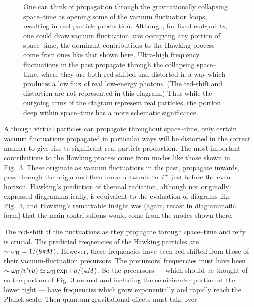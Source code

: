 \documentclass[12pt]{article}
\def\scrif{{\mathcal I}^+}
\begin{document}
\begin{figure}[t]
\epsfxsize=2in
\caption{One can think of propagation through the 
gravitationally collapsing space--time as opening some of the 
vacuum fluctuation loops, resulting in real particle production.  
Although, for fixed end-points, one could draw vacuum fluctuation
arcs occupying any portion of space--time, the dominant contributions
to the Hawking process come from ones like that shown here.
Ultra-high frequency fluctuations in the past propagate through the
collapsing space--time, where they are both red-shifted and distorted
in a way which produces a low flux of real low-energy photons.
(The red-shift and distortion are not represented in this diagram.)
Thus while the outgoing arms of the diagram represent real particles, the
portion deep within space--time has a more schematic significance.
}
\end{figure}

Although virtual particles can propagate throughout space--time, only certain
vacuum fluctuations propagated in particular ways will be distorted in the
correct manner to give rise to significant real particle production.  The most
important contributions to the Hawking process come from modes like those shown
in Fig.~3. These originate as vacuum fluctuations in the past, propagate
inwards, pass through the origin and then move outwards to $\scrif$ just before
the event horizon.  Hawking's prediction of thermal radiation, although not
originally expressed diagrammatically, is equivalent to the evaluation of 
diagrams like Fig.~3, and Hawking's remarkable insight was (again, recast in
diagrammatic form) that the main contributions would come from the modes shown
there.

The red-shift of the fluctuations as they propagate through space--time and
reify is crucial.  The predicted frequencies of the Hawking particles are $\sim
\omega _{\rm H}=1/(8\pi M)$.  However, these frequencies have been red-shifted
from those of their vacuum-fluctuation precursors.  The precursors' frequencies
must have been $\sim \omega _{\rm H}/v'(u)\simeq \omega _{\rm H}\exp +u/(4M)$. 
So the precursors --- which should be thought of as the portion of Fig.~3
around and including the semicircular portion at the lower right --- have
frequencies which grow exponentially and rapidly reach the Planck scale.   Then
quantum-gravitational effects must take over.   
\end{document}
